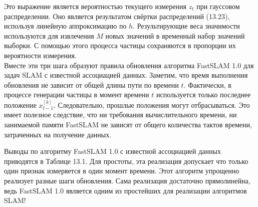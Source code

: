 \documentclass[10pt,a4paper]{article}
\begin{document}
Это выражение является вероятностью текущего измерения $z_t$ при гауссовом распределении. Оно является результатом свёртки распределений (13.23), используя линейную аппроксимацию по $h$. Результирующие веса значимости используются для извлечения $M$ новых значений в временный набор значений выборки. С помощью этого процесса частицы сохраняются в пропорции их вероятности измерения.\\

Вместе эти три шага образуют правила обновления алгоритма FastSLAM 1.0 для задач SLAM с известной ассоциацией данных. Заметим, что время выполнения обновления не зависит от общей длины пути по времени $t$.
Фактически, в процессе генерации частицы в момент времени $t$ используется только последнее положение $x_{t-1}^{[k]}$.  Следовательно, прошлые положения могут отбрасываться. Это имеет полезное следствие, что ни требования вычислительного времени, ни занимаемой памяти FastSLAM не зависят от общего количества тактов времени, затраченных на получение данных.

Выводы по алгоритму FastSLAM 1.0 с известной ассоциацией данных приводятся в Таблице 13.1. Для простоты, эта реализация допускает что только один признак измеряется в один момент времени. Этот алгоритм упрощенно реализует разные шаги обновления. Сама реализация достаточно прямолинейна, ведь FastSLAM 1.0 является одним из простейших для реализации алгоритмов SLAM!
\end{document}
